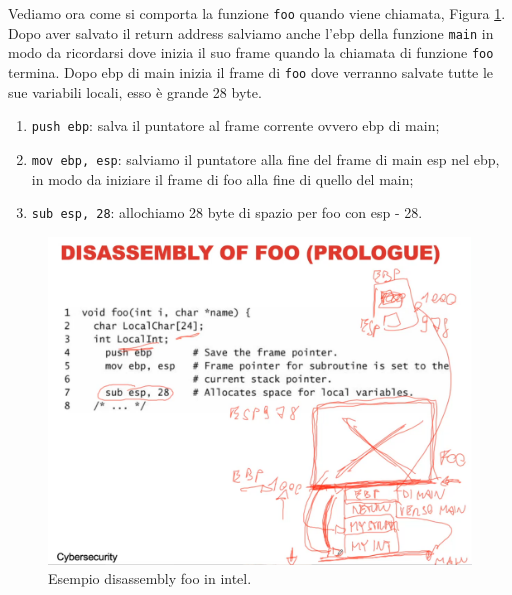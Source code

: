 Vediamo ora come si comporta la funzione \verb|foo| quando viene chiamata, Figura \ref{fig:disass_intel_2}. Dopo aver salvato il return address salviamo anche l'ebp della funzione \verb|main| in modo da ricordarsi dove inizia il suo frame quando la chiamata di funzione \verb|foo| termina. Dopo ebp di main inizia il frame di \verb|foo| dove verranno salvate tutte le sue variabili locali, esso è grande 28 byte.
\begin{enumerate}
    \item \verb|push ebp|: salva il puntatore al frame corrente ovvero ebp di main;
    \item \verb|mov ebp, esp|: salviamo il puntatore alla fine del frame di main esp nel ebp, in modo da iniziare il frame di foo alla fine di quello del main;
    \item \verb|sub esp, 28|: allochiamo 28 byte di spazio per foo con esp - 28.
\end{enumerate}
\begin{figure}[H]
    \centering
    \includegraphics[width=13cm, keepaspectratio]{capitoli/secure_coding/img/cap_2/disass_intel_2.png}
    \caption{Esempio disassembly foo in intel.}\label{fig:disass_intel_2}
\end{figure}

